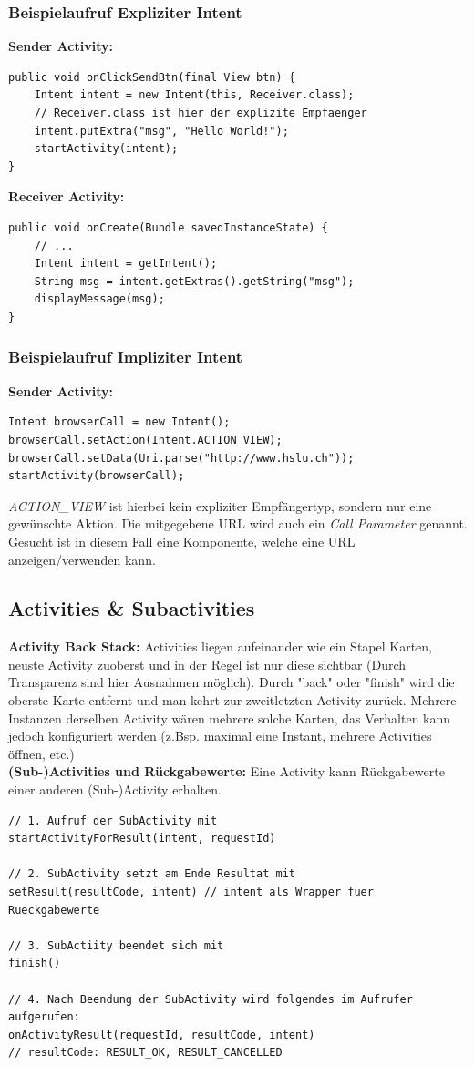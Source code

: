 \documentclass[a4paper]{article}
\begin{document}
\subsubsection{Beispielaufruf Expliziter Intent}
\textbf{Sender Activity:}
\begin{lstlisting}
public void onClickSendBtn(final View btn) {
	Intent intent = new Intent(this, Receiver.class); 
	// Receiver.class ist hier der explizite Empfaenger
	intent.putExtra("msg", "Hello World!");
	startActivity(intent);
}
\end{lstlisting}
\textbf{Receiver Activity:}
\begin{lstlisting}
public void onCreate(Bundle savedInstanceState) {
	// ...
	Intent intent = getIntent();
	String msg = intent.getExtras().getString("msg");
	displayMessage(msg);
}
\end{lstlisting}
\newpage
\subsubsection{Beispielaufruf Impliziter Intent}
\textbf{Sender Activity:}
\begin{lstlisting}
Intent browserCall = new Intent();
browserCall.setAction(Intent.ACTION_VIEW);
browserCall.setData(Uri.parse("http://www.hslu.ch"));
startActivity(browserCall);	
\end{lstlisting}
\textit{ACTION\_VIEW} ist hierbei kein expliziter Empfängertyp, sondern nur eine gewünschte Aktion. Die mitgege\-bene URL wird auch ein \textit{Call Parameter} genannt. Gesucht ist in diesem Fall eine Komponente, welche eine URL anzeigen/verwenden kann.\\
\subsection{Activities \& Subactivities}
\textbf{Activity Back Stack:} Activities liegen aufeinander wie ein Stapel Karten, neuste Activity zuoberst und in der Regel ist nur diese sichtbar (Durch Transparenz sind hier Ausnahmen möglich).
Durch "back" oder "finish" wird die oberste Karte entfernt und man kehrt zur zweitletzten Activity zurück. Mehrere Instanzen derselben Activity wären mehrere solche Karten, das Verhalten kann jedoch konfiguriert werden (z.Bsp. maximal eine Instant, mehrere Activities öffnen, etc.)\\
\textbf{(Sub-)Activities und Rückgabewerte:} Eine Activity kann Rückgabewerte einer anderen (Sub-)Activity erhalten.
\begin{lstlisting}
// 1. Aufruf der SubActivity mit
startActivityForResult(intent, requestId)

// 2. SubActivity setzt am Ende Resultat mit
setResult(resultCode, intent) // intent als Wrapper fuer Rueckgabewerte

// 3. SubActiity beendet sich mit
finish()

// 4. Nach Beendung der SubActivity wird folgendes im Aufrufer aufgerufen:
onActivityResult(requestId, resultCode, intent)
// resultCode: RESULT_OK, RESULT_CANCELLED
\end{lstlisting}
\end{document}
